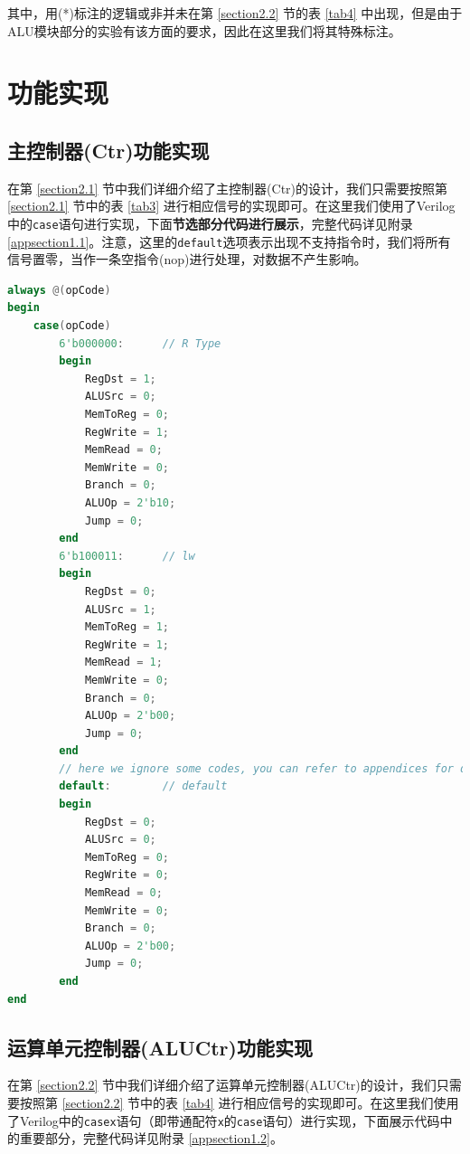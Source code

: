 \documentclass{cumcm}
\numberwithin{equation}{section}
\numberwithin{equation}{subsection}
\begin{document}
其中，用(*)标注的逻辑或非并未在第 \ref{section2.2} 节的表 \ref{tab4} 中出现，但是由于ALU模块部分的实验有该方面的要求，因此在这里我们将其特殊标注。

\section{功能实现}\label{section3}

\subsection{主控制器(Ctr)功能实现}\label{section3.1}

在第 \ref{section2.1} 节中我们详细介绍了主控制器(Ctr)的设计，我们只需要按照第 \ref{section2.1} 节中的表 \ref{tab3} 进行相应信号的实现即可。在这里我们使用了Verilog中的\texttt{case}语句进行实现，下面\textbf{节选部分代码进行展示}，完整代码详见附录 \ref{appsection1.1}。注意，这里的\texttt{default}选项表示出现不支持指令时，我们将所有信号置零，当作一条空指令(nop)进行处理，对数据不产生影响。

\begin{lstlisting}[language=verilog]
always @(opCode)
begin
    case(opCode)
        6'b000000:      // R Type
        begin
            RegDst = 1;
            ALUSrc = 0;
            MemToReg = 0;
            RegWrite = 1;
            MemRead = 0;
            MemWrite = 0;
            Branch = 0;
            ALUOp = 2'b10;
            Jump = 0;
        end
        6'b100011:      // lw
        begin
            RegDst = 0;
            ALUSrc = 1;
            MemToReg = 1;
            RegWrite = 1;
            MemRead = 1;
            MemWrite = 0;
            Branch = 0;
            ALUOp = 2'b00;
            Jump = 0;
        end
        // here we ignore some codes, you can refer to appendices for details. 
        default:        // default
        begin
            RegDst = 0;
            ALUSrc = 0;
            MemToReg = 0;
            RegWrite = 0;
            MemRead = 0;
            MemWrite = 0;
            Branch = 0;
            ALUOp = 2'b00;
            Jump = 0;
        end
end
\end{lstlisting}


\subsection{运算单元控制器(ALUCtr)功能实现}\label{section3.2}

在第 \ref{section2.2} 节中我们详细介绍了运算单元控制器(ALUCtr)的设计，我们只需要按照第 \ref{section2.2} 节中的表 \ref{tab4} 进行相应信号的实现即可。在这里我们使用了Verilog中的\texttt{casex}语句（即带通配符\texttt{x}的\texttt{case}语句）进行实现，下面展示代码中的重要部分，完整代码详见附录 \ref{appsection1.2}。
\end{document}
